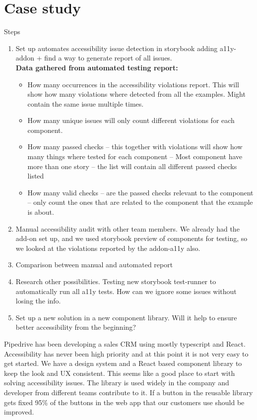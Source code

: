 \documentclass{master_thesis}
\begin{document}
\section{Case study}

Steps
\begin{enumerate}
	\item Set up automates accessibility issue detection in storybook
	adding a11y-addon + find a way to generate report of all issues. \\
	\textbf{Data gathered from automated testing report:}
	\begin{itemize}
		\item How many occurrences in the accessibility violations report. This will show how many violations where detected from all the examples. Might contain the same issue multiple times.
		\item How many unique issues will only count different violations for each component.
		\item How many passed checks – this together with violations will show how many things where tested for each component – Most component have more than one story – the list will contain all different passed checks listed
		\item How many valid checks – are the passed checks relevant to the component – only count the ones that are related to the component that the example is about.
	\end{itemize}
	\item Manual accessibility audit with other team members. We already had the add-on set up, and we used storybook preview of components for testing, so we looked at the violations reported by the addon-a11y also.
	\item Comparison between manual and automated report
	\item Research other possibilities. Testing new storybook test-runner to automatically run all a11y tests. How can we ignore some issues without losing the info.
	\item Set up a new solution in a new component library. Will it help to ensure better accessibility from the beginning?
\end{enumerate}

Pipedrive has been developing a sales CRM using mostly typescript and React. Accessibility has never been high priority and at this point it is not very easy to get started. We have a design system and a React based component library to keep the look and UX consistent. This seems like a good place to start with solving accessibility issues. The library is used widely in the company and developer from different teams contribute to it. If a button in the reusable library gets fixed 95\% of the buttons in the web app that our customers use should be improved.
\end{document}
